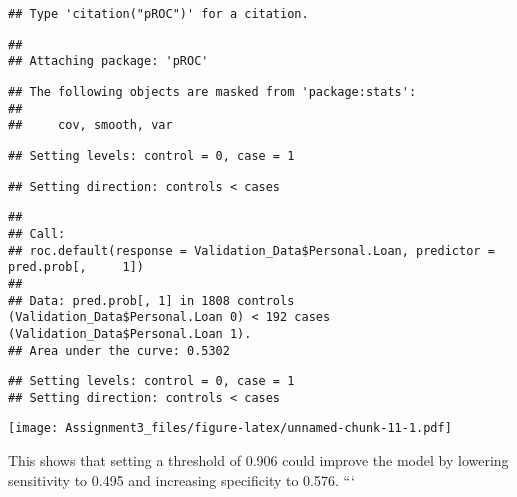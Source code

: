\documentclass[
]{article}
\newenvironment{Shaded}{\begin{snugshade}}{\end{snugshade}}
\newcommand{\AttributeTok}[1]{\textcolor[rgb]{0.77,0.63,0.00}{#1}}
\newcommand{\DecValTok}[1]{\textcolor[rgb]{0.00,0.00,0.81}{#1}}
\newcommand{\FunctionTok}[1]{\textcolor[rgb]{0.00,0.00,0.00}{#1}}
\newcommand{\NormalTok}[1]{#1}
\newcommand{\SpecialCharTok}[1]{\textcolor[rgb]{0.00,0.00,0.00}{#1}}
\newcommand{\StringTok}[1]{\textcolor[rgb]{0.31,0.60,0.02}{#1}}
\begin{document}
\begin{verbatim}
## Type 'citation("pROC")' for a citation.
\end{verbatim}

\begin{verbatim}
## 
## Attaching package: 'pROC'
\end{verbatim}

\begin{verbatim}
## The following objects are masked from 'package:stats':
## 
##     cov, smooth, var
\end{verbatim}

\begin{Shaded}
\end{Shaded}

\begin{verbatim}
## Setting levels: control = 0, case = 1
\end{verbatim}

\begin{verbatim}
## Setting direction: controls < cases
\end{verbatim}

\begin{verbatim}
## 
## Call:
## roc.default(response = Validation_Data$Personal.Loan, predictor = pred.prob[,     1])
## 
## Data: pred.prob[, 1] in 1808 controls (Validation_Data$Personal.Loan 0) < 192 cases (Validation_Data$Personal.Loan 1).
## Area under the curve: 0.5302
\end{verbatim}

\begin{Shaded}
\end{Shaded}

\begin{verbatim}
## Setting levels: control = 0, case = 1
## Setting direction: controls < cases
\end{verbatim}

\texttt{[image: Assignment3\_files/figure-latex/unnamed-chunk-11-1.pdf]}

This shows that setting a threshold of 0.906 could improve the model by
lowering sensitivity to 0.495 and increasing specificity to 0.576. ```
\end{document}
